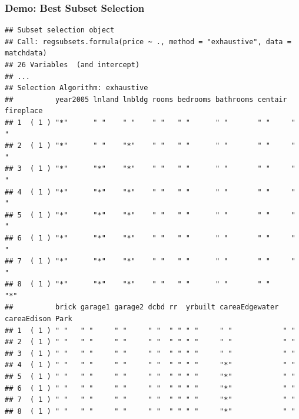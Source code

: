 \documentclass[
  shownotes,
  xcolor={svgnames},
  hyperref={colorlinks,citecolor=DarkBlue,linkcolor=DarkRed,urlcolor=DarkBlue}
  ]{beamer}
\begin{document}
\begin{frame}[fragile]
\frametitle{Demo: Best Subset Selection}

\begin{tiny}
\begin{verbatim}
## Subset selection object
## Call: regsubsets.formula(price ~ ., method = "exhaustive", data = matchdata)
## 26 Variables  (and intercept)
## ...
## Selection Algorithm: exhaustive
##          year2005 lnland lnbldg rooms bedrooms bathrooms centair fireplace
## 1  ( 1 ) "*"      " "    " "    " "   " "      " "       " "     " "      
## 2  ( 1 ) "*"      " "    "*"    " "   " "      " "       " "     " "      
## 3  ( 1 ) "*"      "*"    "*"    " "   " "      " "       " "     " "      
## 4  ( 1 ) "*"      "*"    "*"    " "   " "      " "       " "     " "      
## 5  ( 1 ) "*"      "*"    "*"    " "   " "      " "       " "     " "      
## 6  ( 1 ) "*"      "*"    "*"    " "   " "      " "       " "     " "      
## 7  ( 1 ) "*"      "*"    "*"    " "   " "      " "       " "     " "      
## 8  ( 1 ) "*"      "*"    "*"    " "   " "      " "       " "     "*"      
##          brick garage1 garage2 dcbd rr  yrbuilt careaEdgewater careaEdison Park
## 1  ( 1 ) " "   " "     " "     " "  " " " "     " "            " "             
## 2  ( 1 ) " "   " "     " "     " "  " " " "     " "            " "             
## 3  ( 1 ) " "   " "     " "     " "  " " " "     " "            " "             
## 4  ( 1 ) " "   " "     " "     " "  " " " "     "*"            " "             
## 5  ( 1 ) " "   " "     " "     " "  " " " "     "*"            " "             
## 6  ( 1 ) " "   " "     " "     " "  " " " "     "*"            " "             
## 7  ( 1 ) " "   " "     " "     " "  " " " "     "*"            " "             
## 8  ( 1 ) " "   " "     " "     " "  " " " "     "*"            " "      
\end{verbatim}
\end{tiny}
\end{frame}
\end{document}
